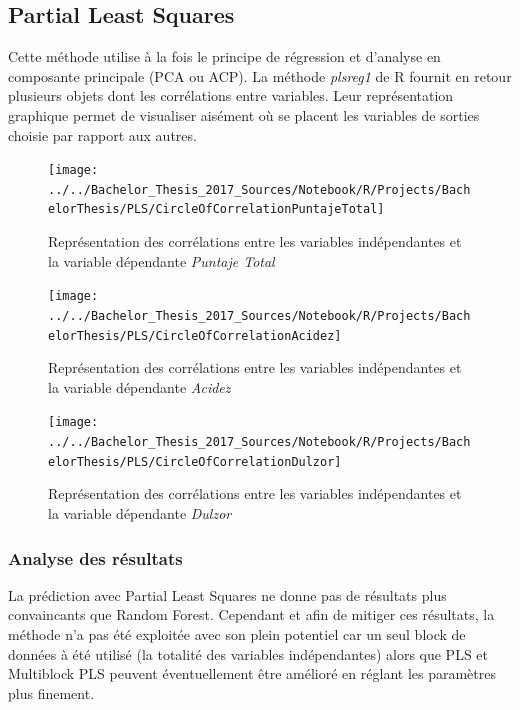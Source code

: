 \newpage

\subsection{Partial Least Squares}
Cette méthode utilise à la fois le principe de régression et d'analyse en composante principale (PCA ou ACP). La méthode \textit{plsreg1} de R fournit en retour plusieurs objets dont les corrélations entre variables. Leur représentation graphique permet de visualiser aisément où se placent les variables de sorties choisie par rapport aux autres. 

\begin{figure}[H]
	\centering
	\texttt{[image: ../../Bachelor\_Thesis\_2017\_Sources/Notebook/R/Projects/BachelorThesis/PLS/CircleOfCorrelationPuntajeTotal]}
	\caption{Représentation des corrélations entre les variables indépendantes et la variable dépendante \textit{Puntaje Total}}
	\label{fig:circleofcorrelationpuntajetotal}
\end{figure}
 
\begin{figure}[H]
	\centering
	\texttt{[image: ../../Bachelor\_Thesis\_2017\_Sources/Notebook/R/Projects/BachelorThesis/PLS/CircleOfCorrelationAcidez]}
	\caption{Représentation des corrélations entre les variables indépendantes et la variable dépendante \textit{Acidez}}
	\label{fig:circleofcorrelationacidez}
\end{figure}

\begin{figure}[H]
	\centering
	\texttt{[image: ../../Bachelor\_Thesis\_2017\_Sources/Notebook/R/Projects/BachelorThesis/PLS/CircleOfCorrelationDulzor]}
	\caption{Représentation des corrélations entre les variables indépendantes et la variable dépendante \textit{Dulzor}}
	\label{fig:circleofcorrelationdulzor}
\end{figure}


\subsubsection{Analyse des résultats}

La prédiction avec Partial Least Squares ne donne pas de résultats plus convaincants que Random Forest. Cependant et afin de mitiger ces résultats, la méthode n'a pas été exploitée avec son plein potentiel car un seul block de données à été utilisé (la totalité des variables indépendantes) alors que PLS et Multiblock PLS peuvent éventuellement être amélioré en réglant les paramètres plus finement. 


